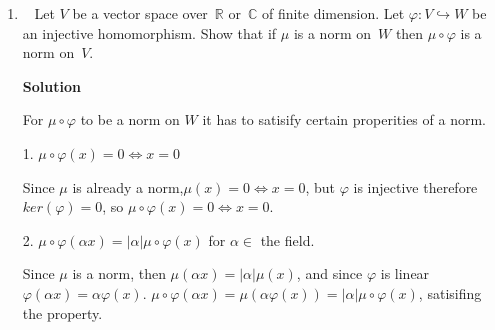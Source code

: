 \documentclass[11pt]{article}
\newcommand\score[1]{\marginpar{\vspace{-2ex}\color{blue}{#1/3}}\hspace{-1ex}}
\newcommand\0{\mathbf{0}}
\newcommand\CC{\mathbb{C}}
\newcommand\RR{\mathbb{R}}
\newcommand\into{\hookrightarrow}
\newcommand\<{\langle}
\renewcommand\>{\rangle}
\begin{document}
\begin{enumerate}
\begin{align*}
  v_1= \begin{bmatrix}
   -1 \\
    -1 \\
    1 \\
    0
  \end{bmatrix} \\
  v_2 = \begin{bmatrix}
    -1 \\
   -1 \\
    0 \\
    1
  \end{bmatrix}
\end{align*}

The geometric multiplicities are 2,3 and 4 for $(A-6I), (A-6I)^2,$ and $(A-6I)^3$ respectively.
So the matrix's jordan form is as below.

\begin{align}
  \begin{bmatrix}
    6 & 0 & 0 & 0\\
    0 & 6 & 1 & 0\\
    0 & 0 & 6 & 1\\
    0 & 0 & 0 & 6
  \end{bmatrix}
\end{align}


\pagebreak





\item\ \score{3}%
Let $V$ be a vector space over~$\RR$ or~$\CC$ of finite dimension.
Let $\varphi: V \into W$ be an injective homomorphism.  Show that if
$\mu$ is a norm on~$W$ then $\mu \circ \varphi$ is a norm on~$V$.


\textbf{Solution}


For $\mu \circ \varphi$ to be a norm on $W$ it has to satisify 
certain properities of a norm.

1. $\mu \circ \varphi(x)=0 \Leftrightarrow x=0$

Since $\mu$ is already a norm,$\mu (x)=0 \Leftrightarrow x=0$, but $\varphi$
is injective therefore $ker(\varphi) = {0}$, so $\mu \circ \varphi(x)=0 \Leftrightarrow x=0$.

2. $\mu \circ \varphi(\alpha x)=|\alpha| \mu \circ \varphi(x)$ for $\alpha \in $ the field.

Since $\mu$ is a norm, then $\mu(\alpha x) = |\alpha| \mu (x)$, and since $\varphi$ is linear $\varphi(\alpha x)=\alpha \varphi (x)$. 
$\mu \circ \varphi(\alpha x)= \mu(\alpha \varphi(x) ) = |\alpha| \mu \circ \varphi(x)$, satisifing the property.


\end{enumerate}
\end{document}
